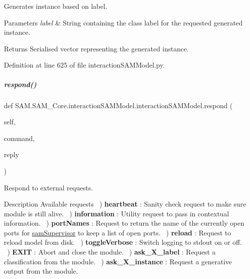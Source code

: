 Generates instance based on label. 


\begin{DoxyParams}{Parameters}
{\em label} & String containing the class label for the requested generated instance.\\
\hline
\end{DoxyParams}
\begin{DoxyReturn}{Returns}
Serialised vector representing the generated instance. 
\end{DoxyReturn}


Definition at line 625 of file interaction\+S\+A\+M\+Model.\+py.

\mbox{\label{group__icubclient__SAM__Core_a5c4de12a5f89c6885bebdf8d0c37d806}} 
\subparagraph{\texorpdfstring{respond()}{respond()}}
{\footnotesize\ttfamily def S\+A\+M.\+S\+A\+M\+\_\+\+Core.\+interaction\+S\+A\+M\+Model.\+interaction\+S\+A\+M\+Model.\+respond (\begin{DoxyParamCaption}\item[{}]{self,  }\item[{}]{command,  }\item[{}]{reply }\end{DoxyParamCaption})}



Respond to external requests. 

\begin{DoxyParagraph}{Description}
Available requests ~) {\bfseries heartbeat} \+: Sanity check request to make sure module is still alive. ~) {\bfseries information} \+: Utility request to pass in contextual information. ~) {\bfseries port\+Names} \+: Request to return the name of the currently open ports for \hyperlink{namespaceSAM_1_1SAM__Core_1_1samSupervisor}{sam\+Supervisor} to keep a list of open ports. ~) {\bfseries reload} \+: Request to reload model from disk. ~) {\bfseries toggle\+Verbose} \+: Switch logging to stdout on or off. ~) {\bfseries E\+X\+IT} \+: Abort and close the module. ~) {\bfseries ask\+\_\+\+X\+\_\+label} \+: Request a classification from the module. ~) {\bfseries ask\+\_\+\+X\+\_\+instance} \+: Request a generative output from the module. ~\newline

\end{DoxyParagraph}

